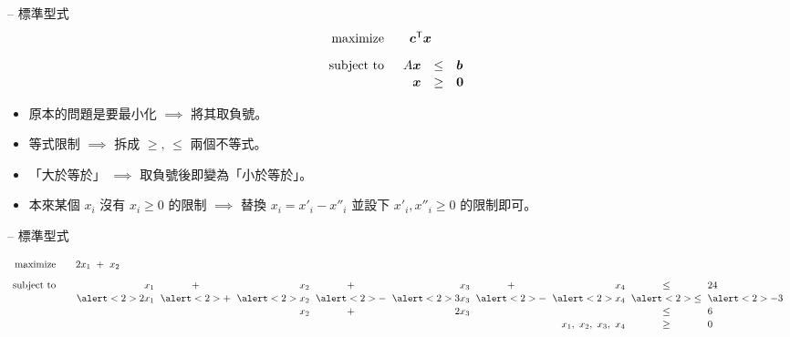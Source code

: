 \documentclass[standalone]{beamer}
\begin{document}
\begin{frame}{{\secname} -- 標準型式}
\[
\linearprog{\bm{c}^\mathsf{T} \bm{x}}{
  \begin{array}[t]{rcl}
    A\bm{x} & \leq & \bm{b} \\
    \bm{x}  & \geq & \bm{0}
  \end{array}
}
\]
\begin{itemize}
  \item<+-> 原本的問題是要最小化 $\implies$ 將其取負號。 
  \item<+-> 等式限制 $\implies$ 拆成 $\geq,\, \leq$ 兩個不等式。
  \item<+-> 「大於等於」 $\implies$ 取負號後即變為「小於等於」。
  \item<+-| alert@+> 本來某個 $x_i$ 沒有 $x_i \geq 0$ 的限制 $\implies$ 替換 $x_i = x'_i - x''_i$
    並設下 $x'_i, x''_i \geq 0$ 的限制即可。
\end{itemize}
\end{frame}

\begin{frame}{{\secname} -- 標準型式}
\begin{overlayarea}{\textwidth}{3cm}
   {
    \[
      \linearprog{2x_1 \ + \ x_2}{
        {
          \arraycolsep=3pt
          \begin{array}[t]{*4{rc}l}
            x_1 & + & x_2 & + & x_3 & + & x_4 & \leq & 24 \\
            \phantom{-}\alert<2>{2x_1} & \alert<2>{+} & \alert<2>{x_2} & \alert<2>{-} &
            \alert<2>{3x_3} & \alert<2>{-} & \alert<2>{x_4} & \alert<2>{\leq} & \alert<2>{-3} \\
            &   & x_2 & + & 2x_3 &   & & \leq & 6 \\
            \multicolumn{7}{r}{x_1,\ x_2,\ x_3,\ x_4} & \geq & 0 \\
          \end{array}
        }
      }
    \]
  }
\end{overlayarea}
\end{frame}
\end{document}
